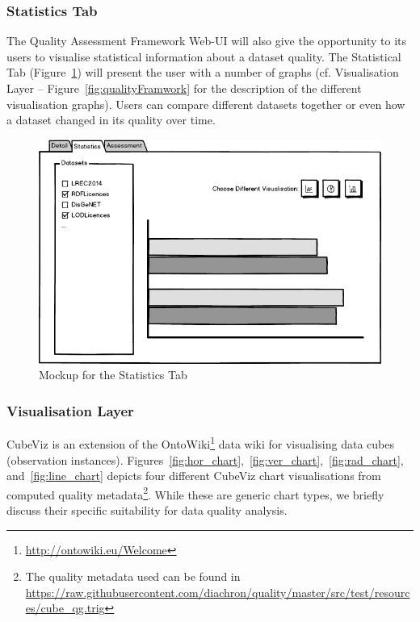 \subsubsection{Statistics Tab}
The Quality Assessment Framework Web-UI will also give the opportunity to its users to visualise statistical information about a dataset quality.
The Statistical Tab (Figure~\ref{fig:uiStatisticsTab}) will present the user with a number of graphs (cf. Visualisation Layer – Figure~\ref{fig:qualityFramwork} for the description of the different visualisation graphs).
Users can compare different datasets together or even how a dataset changed in its quality over time.

\begin{figure}[tbph]
\center
\includegraphics[width=\textwidth]{images/uiStatisticsTab.png} 
\caption{Mockup for the Statistics Tab} 
\label{fig:uiStatisticsTab}
\end{figure}

\subsubsection{Visualisation Layer}
\label{sec:vislayer_hla}
CubeViz is an extension of the OntoWiki\footnote{\url{http://ontowiki.eu/Welcome}} data wiki for visualising data cubes (observation instances).
Figures~\ref{fig:hor_chart},~\ref{fig:ver_chart},~\ref{fig:rad_chart}, and~\ref{fig:line_chart} depicts four different CubeViz chart visualisations from computed quality metadata\footnote{The quality metadata used can be found in \url{https://raw.githubusercontent.com/diachron/quality/master/src/test/resources/cube_qg.trig}}.  While these are generic chart types, we briefly discuss their specific suitability for data quality analysis.

